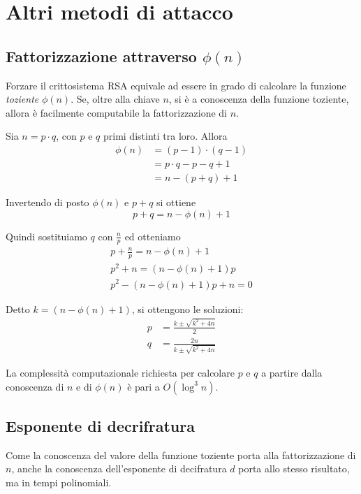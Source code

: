 %
%
\section{Altri metodi di attacco}
%
%

%
\subsection{Fattorizzazione attraverso $\phi(n)$}
%

Forzare il crittosistema RSA equivale ad essere in grado di calcolare la funzione \emph{toziente} $\phi(n)$. Se, oltre alla chiave $n$, si è a conoscenza della funzione toziente, allora è facilmente computabile la fattorizzazione di $n$.

Sia $n = p \cdot q$, con $p$ e $q$ primi distinti tra loro. Allora
\begin{align*}
	\phi(n) &= (p-1) \cdot (q-1) \\
	&= p \cdot q - p - q + 1 \\
	&= n - (p+q) + 1
\end{align*}

Invertendo di posto $\phi(n)$ e $p+q$ si ottiene \[ p+q = n - \phi(n) + 1 \]

Quindi sostituiamo $q$ con $\frac{n}{p}$ ed otteniamo
\begin{gather*}
	p + \frac{n}{p} = n - \phi(n) + 1 \\
	p^2 + n = \left( n - \phi(n) + 1 \right)p \\
	p^2 - \left( n - \phi(n) + 1 \right)p + n = 0
\end{gather*}

Detto $k = \left( n - \phi(n) + 1 \right)$, si ottengono le soluzioni: 
\begin{align*}
	p &= \frac{k \pm \sqrt{k^2 + 4n}}{2} \\
	q &= \frac{2n}{k \pm \sqrt{k^2 + 4n}}
\end{align*}

La complessità computazionale richiesta per calcolare $p$ e $q$ a partire dalla conoscenza di $n$ e di $\phi(n)$ è pari a $O(\log^3 n)$.


%
\subsection{Esponente di decrifratura}
%

Come la conoscenza del valore della funzione toziente porta alla fattorizzazione di $n$, anche la conoscenza dell'esponente di decifratura $d$ porta allo stesso risultato, ma in tempi polinomiali.

